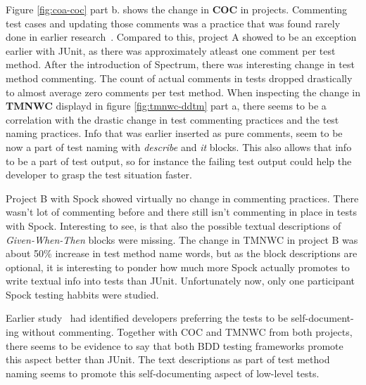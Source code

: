 Figure \ref{fig:coa-coc} part b. shows the change in \textbf{COC} in projects. Commenting test cases and updating those
comments was a practice that was found rarely done in earlier research~\cite{li2016automatically}. Compared to this,
project A showed to be an exception earlier with JUnit, as there was approximately atleast one comment per test method.
After the introduction of Spectrum, there was interesting change in test method commenting. The count of actual comments
in tests dropped drastically to almost average zero comments per test method. When inspecting the change in \textbf{TMNWC}
displayd in figure \ref{fig:tmnwc-ddtm} part a, there seems to be a correlation with the drastic change in test commenting
practices and the test naming practices. Info that was earlier inserted as pure comments, seem to be now a part of test
naming with \textit{describe} and \textit{it} blocks. This also allows that info to be a part of test output, so for instance
the failing test output could help the developer to grasp the test situation faster.

Project B with Spock showed virtually no change in commenting practices. There wasn't lot of commenting before and there still isn't
commenting in place in tests with Spock. Interesting to see, is that also the possible textual descriptions of \textit{Given-When-Then} blocks
were missing. The change in TMNWC in project B was about 50\% increase in test method name words, but as the block descriptions
are optional, it is interesting to ponder how much more Spock actually promotes to write textual info into tests than
JUnit. Unfortunately now, only one participant Spock testing habbits were studied.

Earlier study~\cite{li2016automatically} had identified developers preferring the tests to be self-document- ing without commenting.
Together with COC and TMNWC from both projects, there seems to be evidence to say that both BDD testing frameworks
promote this aspect better than JUnit. The text descriptions as part of test method naming seems to promote this self-documenting
aspect of low-level tests.

